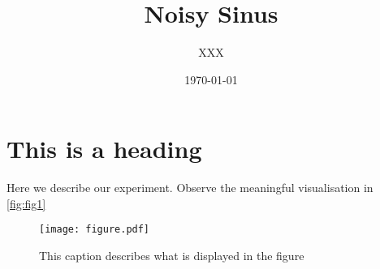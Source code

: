 \documentclass{article}
\title{Noisy Sinus}
\author{XXX}
\date{\today}
\begin{document}
    \maketitle
   
    \section{This is a heading}
    Here we describe our experiment. Observe the meaningful visualisation in \autoref{fig:fig1}
    \begin{figure}[htb]
    	\centering
    	\texttt{[image: figure.pdf]}
    	\caption{This caption describes what is displayed in the figure}
    	\label{fig:fig1}
    \end{figure}
\end{document}
